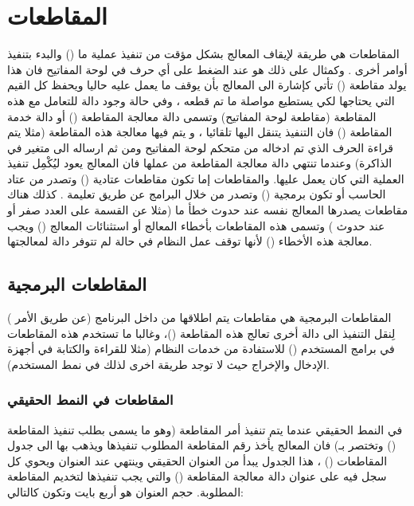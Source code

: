 \documentclass[document.tex]{subfiles}
\begin{document}

\chapter{المقاطعات }
المقاطعات هي طريقة لإيقاف المعالج بشكل مؤقت من تنفيذ عملية ما () والبدء بتنفيذ أوامر أخرى . وكمثال على ذلك هو عند الضغط على أي حرف في لوحة المفاتيح فان هذا يولد مقاطعة () تأتي كإشارة الى المعالج بأن يوقف ما يعمل عليه حاليا ويحفظ كل القيم التي يحتاجها لكي يستطيع مواصلة ما تم قطعه ، وفي حالة وجود دالة للتعامل مع هذه المقاطعة (مقاطعة لوحة المفاتيح) وتسمى دالة معالجة المقاطعة () أو دالة خدمة المقاطعة () فان التنفيذ يتنقل اليها تلقائيا ، و يتم فيها معالجة هذه المقاطعة (مثلا يتم قراءة الحرف الذي تم ادخاله من متحكم لوحة المفاتيح ومن ثم ارساله الى متغير في الذاكرة) وعندما تنتهي دالة معالجة المقاطعة من عملها فان المعالج يعود ليُكْمِل تنفيذ العملية التي كان يعمل عليها. والمقاطعات إما تكون مقاطعات عتادية () وتصدر من عتاد الحاسب أو تكون برمجية () وتصدر من خلال البرامج عن طريق تعليمة . كذلك هناك مقاطعات يصدرها المعالج نفسه عند حدوث خطأ ما (مثلا عن القسمة على العدد صفر أو عند حدوث ) وتسمى هذه المقاطعات بأخطاء المعالج أو استثنائات المعالج () ويجب معالجة هذه الأخطاء () لأنها توقف عمل النظام في حالة لم تتوفر دالة لمعالجتها.


\section{المقاطعات البرمجية }
المقاطعات البرمجية هي مقاطعات يتم اطلاقها من داخل البرنامج (عن طريق الأمر ) لِنقل التنفيذ الى دالة أخرى تعالج هذه المقاطعة ()، وغالبا ما تستخدم هذه المقاطعات في برامج المستخدم () للاستفادة من خدمات النظام (مثلا للقراءة والكتابة في أجهزة الإدخال والإخراج حيث لا توجد طريقة اخرى لذلك في نمط المستخدم).

\subsection{المقاطعات في النمط الحقيقي}
في النمط الحقيقي عندما يتم تنفيذ أمر المقاطعة (وهو ما يسمى بطلب تنفيذ المقاطعة () وتختصر بـ)  فان المعالج يأخذ رقم المقاطعة المطلوب تنفيذها ويذهب بها الى جدول المقاطعات () ، هذا الجدول يبدأ من العنوان الحقيقي  وينتهي عند العنوان  ويحوي كل سجل فيه على عنوان دالة معالجة المقاطعة () والتي يجب تنفيذها لتخديم المقاطعة المطلوبة. حجم العنوان هو أربع بايت وتكون كالتالي:
\end{document}
